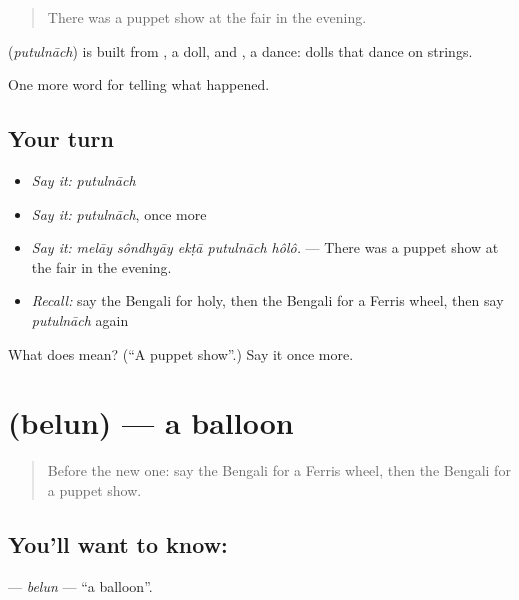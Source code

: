 \begin{quote}
There was a puppet show at the fair in the evening.
\end{quote}

\begin{cousinweb}
\textbf{} (\emph{putulnāch}) is built from \textbf{}, a doll, and \textbf{}, a dance: dolls that dance on strings.
\end{cousinweb}

\begin{grammarlens}[title={What you've built}]
One more word for telling what happened.
\end{grammarlens}

\subsection*{Your turn}
\begin{itemize}
\raggedright
  \item \emph{Say it:} \emph{putulnāch}
  \item \emph{Say it:} \emph{putulnāch}, once more
  \item \emph{Say it:} \emph{melāy sôndhyāy ekṭā putulnāch hôlô.} — There was a puppet show at the fair in the evening.
  \item \emph{Recall:} say the Bengali for holy, then the Bengali for a Ferris wheel, then say \emph{putulnāch} again
\end{itemize}

\begin{tcolorbox}[breakable,colback=teal!4,colframe=teal!35!black,title={Before you move on}]
What does  mean? (\textquotedblleft{}A puppet show\textquotedblright{}.) Say it once more.
\end{tcolorbox}
\section[\texorpdfstring{\bn{বেলুন} (belun)}{বেলুন (belun)}]{ (belun) — a balloon}

\label{lesson:BN-C311-belun}



\begin{quote}
Before the new one: say the Bengali for a Ferris wheel, then the Bengali for a puppet show.
\end{quote}

\subsection*{You'll want to know: }
\textbf{} — \emph{belun} — \textquotedblleft{}a balloon\textquotedblright{}.

